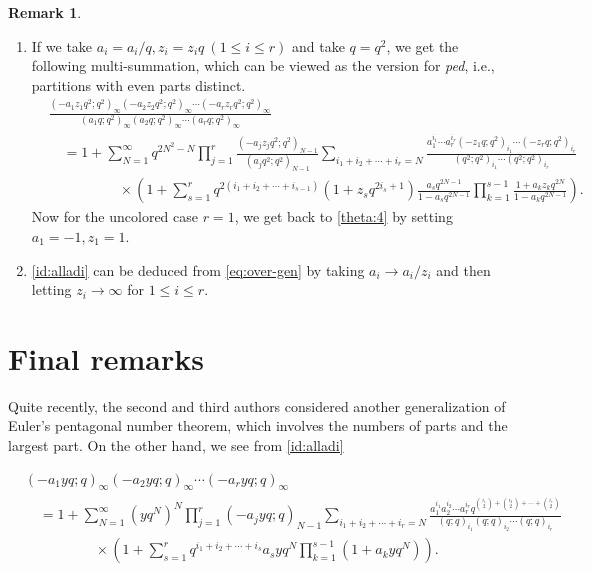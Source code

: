 \documentclass[12pt,reqno]{amsart}
\numberwithin{equation}{section}
\theoremstyle{plain}
\theoremstyle{definition}
\newtheorem{remark}[theorem]{Remark}
\begin{document}
\begin{remark}
\begin{enumerate}[1).]
\item If we take $a_i=a_i\slash q, z_i=z_iq\:(1\le i\le r)$ and take $q=q^2$, we get the following multi-summation, which can be viewed as the version for {\em ped}, i.e., partitions with even parts distinct.
\begin{align}
&\frac{(-a_{1} z_1 q^2;q^2)_{\infty}(-a_{2} z_2 q^2;q^2)_{\infty}\cdots(-a_{r} z_r q^2;q^2)_{\infty}}{(a_{1}q;q^2)_{\infty}(a_{2}q;q^2)_{\infty}\cdots(a_{r}q;q^2)_{\infty}}\nonumber\\
&\quad=1+\sum_{N=1}^{\infty}q^{2N^{2}-N}\prod_{j=1}^{r}\frac{(-a_{j} z_j q^2;q^2)_{N-1}}{(a_{j}q^2;q^2)_{N-1}} \sum_{i_{1}+i_{2}+\cdots+i_{r}=N}\frac{a_{1}^{i_{1}}\cdots a_{r}^{i_{r}}(-z_1q;q^2)_{i_{1}}\cdots(-z_rq;q^2)_{i_{r}}}{(q^2;q^2)_{i_{1}}\cdots(q^2;q^2)_{i_{r}}}\nonumber\\
&\quad\quad\quad\quad\quad\times \left(1+\sum_{s=1}^{r}q^{2(i_1+i_2+\cdots+i_{s-1})}\left(1+z_s q^{2i_s+1}\right) \frac{a_s q^{2N-1}}{1-a_s q^{2N-1}}  \prod_{k=1}^{s-1} \frac{1+a_k z_k q^{2N}}{1-a_k q^{2N-1}}\right).\label{eq:ped-gen}
\end{align}
Now for the uncolored case $r=1$, we get back to \eqref{theta:4} by setting $a_1=-1,z_1=1$.
\item \eqref{id:alladi} can be deduced from \eqref{eq:over-gen} by taking $a_i \to a_i/z_i$ and then letting $z_i\to \infty$ for $1\le i\le r$.
\end{enumerate}

\end{remark}



\section{Final remarks}











Quite recently, the second and third authors \cite[Eq.~(3.7)]{FT} considered another generalization of Euler's pentagonal number theorem, which involves the numbers of parts and the largest part. On the other hand, we see from \eqref{id:alladi}





\begin{align}
&(-a_{1}yq;q)_{\infty}(-a_{2}yq;q)_{\infty}\cdots(-a_{r}yq;q)_{\infty}\nonumber\\
&\quad=1+\sum_{N=1}^{\infty}\left(y q^N\right)^N\prod_{j=1}^{r}(-a_{j}yq;q)_{N-1} \sum_{i_{1}+i_{2}+\cdots+i_{r}=N}\frac{a_{1}^{i_{1}}a_{2}^{i_{2}}\cdots a_{r}^{i_{r}}q^{\binom{i_1}{2}+\binom{i_2}{2}+\cdots+\binom{i_r}{2}}}{(q;q)_{i_{1}}(q;q)_{i_{2}}\cdots(q;q)_{i_{r}}}\nonumber\\
&\quad\quad\quad\quad\quad\times \left(1+\sum_{s=1}^{r}q^{i_1+i_2+\cdots+i_s}a_s y q^N \prod_{k=1}^{s-1}\left(1+a_k y q^N\right)\right).\label{eq3.1}
\end{align}
\end{document}
